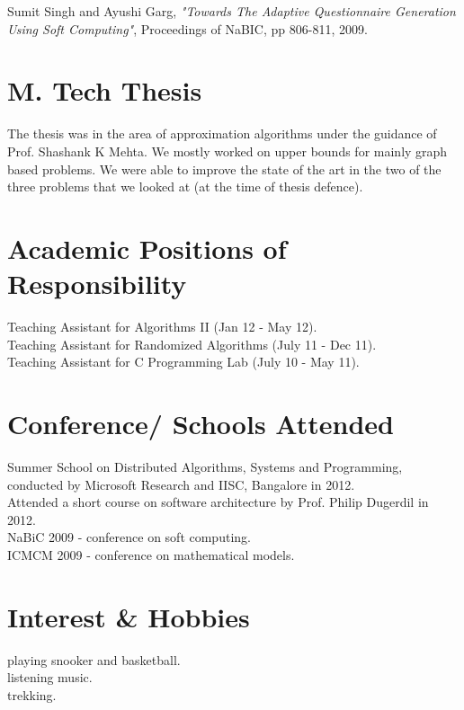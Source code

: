\documentclass[margin,line]{resume}
\begin{document}
\begin{resume}
\vspace{-2mm}
Sumit Singh and Ayushi Garg, \textit{"Towards The Adaptive Questionnaire Generation Using Soft Computing"}, Proceedings of NaBIC, pp 806-811, 2009.



    \section{\mysidestyle M. Tech Thesis}
The thesis was in the area of approximation algorithms under the guidance of Prof. Shashank K Mehta. 
We mostly worked on upper bounds for mainly graph based problems. We were able to improve the state of the art in  the two of the three problems that we looked at (at the time of thesis defence).
   
   

    \section{\mysidestyle Academic Positions of Responsibility} 
	Teaching Assistant for Algorithms II (Jan 12 - May 12).\\ 
	Teaching Assistant for Randomized Algorithms (July 11 - Dec 11).\\ 
	Teaching Assistant for C Programming Lab (July 10 - May 11).\\
    \section{\mysidestyle Conference/ Schools Attended}
    Summer School on Distributed Algorithms, Systems and Programming, conducted by Microsoft Research and IISC, Bangalore in 2012. \\
    Attended a short course on software architecture by Prof. Philip Dugerdil in 2012. \\
    NaBiC 2009 - conference on soft computing. \\
    ICMCM 2009 - conference on mathematical models. \\

    \section{\mysidestyle Interest \& Hobbies}
    playing snooker and basketball.\\
    listening music.\\
    trekking.\\ 

\end{resume}
\end{document}
